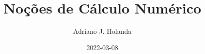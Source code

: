 \documentclass{article}
\begin{document}
\title{Noções de Cálculo Numérico}
\author{Adriano J. Holanda}
\date{2022-03-08}
\maketitle





\end{document}
